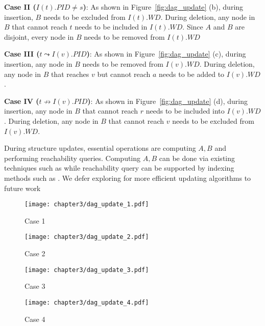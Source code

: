 \textbf{Case II ($I(t).PID \neq s$)}: As shown in Figure~\ref{fig:dag_update} (b), during insertion, $B$ needs to be excluded from $I(t).WD$. During deletion, any node in $B$ that cannot reach $t$ needs to be included in $I(t).WD$. Since $A$ and $B$ are disjoint, every node in $B$ needs to be removed from $I(t).WD$

\textbf{Case III ($t \leadsto I(v).PID$)}: As shown in Figure~\ref{fig:dag_update} (c), during insertion, any node in $B$ needs to be removed from $I(v).WD$. During deletion, any node in $B$ that reaches $v$ but cannot reach $a$ needs to be added to $I(v).WD$.

\textbf{Case IV ($t \nrightarrow I(v).PID$)}: As shown in Figure~\ref{fig:dag_update} (d), during insertion, any node in $B$ that cannot reach $r$ needs to be included into $I(v).WD$. During deletion, any node in $B$ that cannot reach $v$ needs to be excluded from $I(v).WD$.

During structure updates, essential operations are computing $A,B$ and performing reachability queries. Computing $A,B$ can be done via existing techniques such as \cite{bender2005lowest,czumaj2007faster} while reachability query can be supported by indexing methods such as \cite{yildirim2013dagger}. We defer exploring for more efficient updating algorithms to future work 


\begin{figure*}[t]
\centering
\begin{subfigure}{0.22\linewidth}
  \texttt{[image: chapter3/dag\_update\_1.pdf]}
  \caption{Case 1}
\end{subfigure}%
\begin{subfigure}{0.22\linewidth}
  \texttt{[image: chapter3/dag\_update\_2.pdf]}
  \caption{ Case 2}
\end{subfigure}
\begin{subfigure}{0.205\linewidth}
  \texttt{[image: chapter3/dag\_update\_3.pdf]}
  \caption{Case 3}
\end{subfigure}
\begin{subfigure}{0.22\linewidth}
  \texttt{[image: chapter3/dag\_update\_4.pdf]}
  \caption{Case 4}
\end{subfigure}
\caption{Updates on \emph{I-Index}. Cloud shape indicate the nodes in the subgraph between the endpoint nodes. The dashed circle indicate the affected range of updates. The bold arrow indicates the $PID$ field \emph{I-Index}}
\label{fig:dag_update}
\end{figure*}
